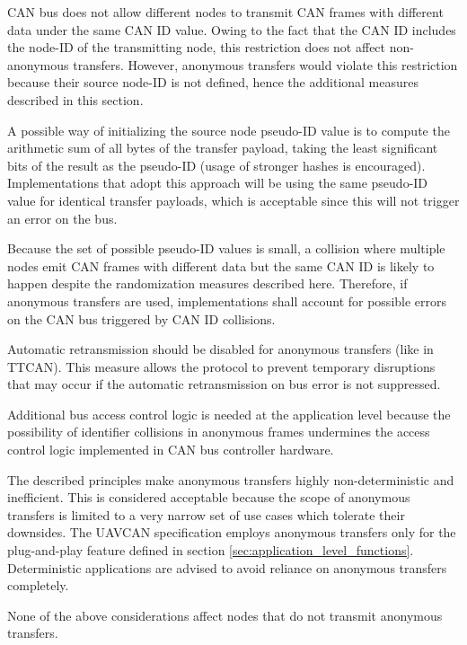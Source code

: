 \begin{remark}[breakable]
    CAN bus does not allow different nodes to transmit CAN frames with different data under the same CAN ID value.
    Owing to the fact that the CAN ID includes the node-ID of the transmitting node,
    this restriction does not affect non-anonymous transfers.
    However, anonymous transfers would violate this restriction because their source node-ID is not defined,
    hence the additional measures described in this section.

    A possible way of initializing the source node pseudo-ID value is to compute the arithmetic sum
    of all bytes of the transfer payload, taking the least significant bits of the result as the pseudo-ID
    (usage of stronger hashes is encouraged).
    Implementations that adopt this approach will be using the same pseudo-ID value for identical transfer payloads,
    which is acceptable since this will not trigger an error on the bus.

    Because the set of possible pseudo-ID values is small,
    a collision where multiple nodes emit CAN frames with different data but the same CAN ID is likely to happen
    despite the randomization measures described here.
    Therefore, if anonymous transfers are used,
    implementations shall account for possible errors on the CAN bus triggered by CAN ID collisions.

    Automatic retransmission should be disabled for anonymous transfers (like in TTCAN).
    This measure allows the protocol to prevent temporary disruptions that may occur if the automatic
    retransmission on bus error is not suppressed.

    Additional bus access control logic is needed at the application level because
    the possibility of identifier collisions in anonymous frames undermines the access control logic implemented
    in CAN bus controller hardware.

    The described principles make anonymous transfers highly non-deterministic and inefficient.
    This is considered acceptable because the scope of anonymous transfers is limited to a very narrow set of use
    cases which tolerate their downsides. The UAVCAN specification employs anonymous transfers only for the
    plug-and-play feature defined in section \ref{sec:application_level_functions}.
    Deterministic applications are advised to avoid reliance on anonymous transfers completely.

    None of the above considerations affect nodes that do not transmit anonymous transfers.
\end{remark}

